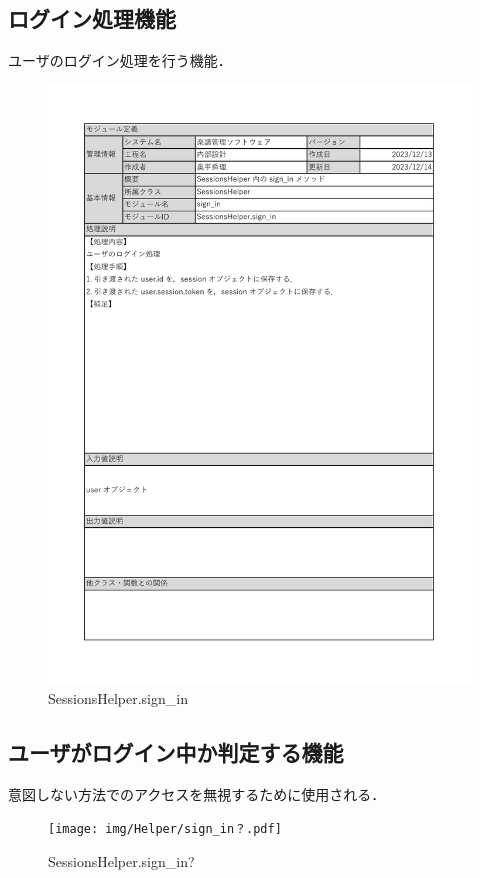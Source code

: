 \subsection*{ログイン処理機能}
ユーザのログイン処理を行う機能．
\begin{figure}[H]
    \centering
    \includegraphics[scale=0.5]{img/Helper/sign_in.pdf}
    \caption{SessionsHelper.sign\_in}
\end{figure}
\clearpage

\subsection*{ユーザがログイン中か判定する機能}
意図しない方法でのアクセスを無視するために使用される．
\begin{figure}[H]
    \centering
    \texttt{[image: img/Helper/sign\_in？.pdf]}
    \caption{SessionsHelper.sign\_in?}
    \label{SessionsHelper.sign-in?}
\end{figure}
\clearpage

